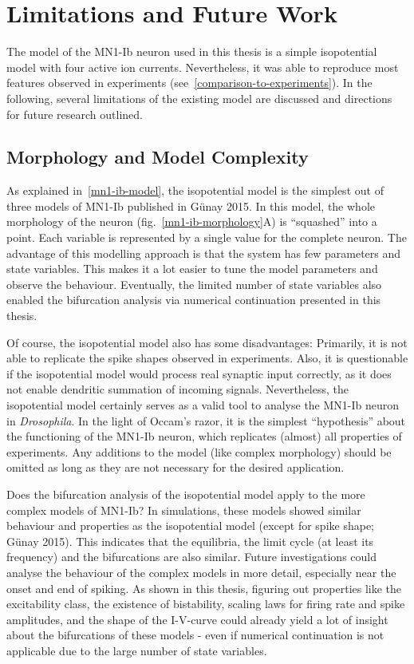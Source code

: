 \documentclass[12pt,a4paper,]{report}
\begin{document}
\section{Limitations and Future Work}\label{limitations-and-future-work}

The model of the MN1-Ib neuron used in this thesis is a simple
isopotential model with four active ion currents. Nevertheless, it was
able to reproduce most features observed in experiments
(see~\ref{comparison-to-experiments}). In the following, several
limitations of the existing model are discussed and directions for
future research outlined.

\subsection{Morphology and Model
Complexity}\label{morphology-and-model-complexity}

As explained in~\ref{mn1-ib-model}, the isopotential model is the
simplest out of three models of MN1-Ib published in Günay 2015. In this
model, the whole morphology of the neuron
(fig.~\ref{mn1-ib-morphology}A) is ``squashed'' into a point. Each
variable is represented by a single value for the complete neuron. The
advantage of this modelling approach is that the system has few
parameters and state variables. This makes it a lot easier to tune the
model parameters and observe the behaviour. Eventually, the limited
number of state variables also enabled the bifurcation analysis via
numerical continuation presented in this thesis.

Of course, the isopotential model also has some disadvantages:
Primarily, it is not able to replicate the spike shapes observed in
experiments. Also, it is questionable if the isopotential model would
process real synaptic input correctly, as it does not enable dendritic
summation of incoming signals. Nevertheless, the isopotential model
certainly serves as a valid tool to analyse the MN1-Ib neuron in
\emph{Drosophila}. In the light of Occam's razor, it is the simplest
``hypothesis'' about the functioning of the MN1-Ib neuron, which
replicates (almost) all properties of experiments. Any additions to the
model (like complex morphology) should be omitted as long as they are
not necessary for the desired application.

Does the bifurcation analysis of the isopotential model apply to the
more complex models of MN1-Ib? In simulations, these models showed
similar behaviour and properties as the isopotential model (except for
spike shape; Günay 2015). This indicates that the equilibria, the limit
cycle (at least its frequency) and the bifurcations are also similar.
Future investigations could analyse the behaviour of the complex models
in more detail, especially near the onset and end of spiking. As shown
in this thesis, figuring out properties like the excitability class, the
existence of bistability, scaling laws for firing rate and spike
amplitudes, and the shape of the I-V-curve could already yield a lot of
insight about the bifurcations of these models - even if numerical
continuation is not applicable due to the large number of state
variables.
\end{document}
